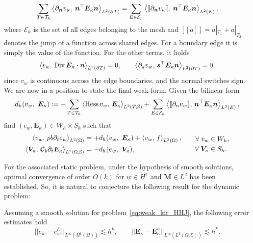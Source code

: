 \begin{equation*}
\sum_{T \in \mathcal{T}_h} \inner[L^2(\partial T)]{\partial_{\bm{n}} v_w}{\bm{n}^\top\bm{E}_\kappa \bm{n}} = \sum_{E \in \mathcal{E}_h} \inner[L^2(E)]{[\![\partial_{\bm{n}} v_w]\!]}{\bm{n}^\top\bm{E}_\kappa \bm{n}},
\end{equation*} 
where $\mathcal{E}_h$ is the set of all edges belonging to the mesh and $[\![a]\!] = a|_{T_1} + a|_{T_2}$ denotes the jump of a function across shared edges. For a boundary edge it is simply the value of the function. For the other terms, it holds 
\[
\inner[L^2(\partial T)]{v_w}{\Div \bm{E}_\kappa \cdot \bm{n}} = 0, \qquad \inner[L^2(\partial T)]{\partial_{\bm{s}} v_w}{\bm{s}^\top\bm{E}_\kappa \bm{n}} = 0,
\]
since $v_w$ is continuous across the edge boundaries, and the normal switches sign. We are now in a position to state the final weak form. Given the bilinear form
\begin{equation}\label{eq:bil_HHJ}
d_h(v_w, \ \bm{E}_{\kappa}) := - \sum_{T \in \mathcal{T}_h} \inner[L^2(T, \mathbb{S})]{\Hess v_w}{\bm{E}_\kappa} + \sum_{E \in \mathcal{E}_h} \inner[L^2(E)]{[\![\partial_n v_w]\!]}{\bm{n}^\top\bm{E}_\kappa \bm{n}}, 
\end{equation}
find $(e_w, \bm{E}_\kappa) \in W_h \times S_h$ such that
\begin{equation}
\label{eq:weak_kir_HHJ}
\begin{aligned}
\inner[L^2(\Omega)]{v_w}{\rho b \partial_t {e}_w} &= +d_h(v_w, \ \bm{E}_{\kappa}) + \inner[L^2(\Omega)]{v_w}{f}, \\ 
\inner[L^2(\Omega, \mathbb{S})]{\bm{V}_\kappa}{\bm{\mathcal{C}}_b \partial_t {\bm{E}}_\kappa} &= -d_h(e_w, \ \bm{V}_{\kappa}), \\ 
\end{aligned} \qquad
\begin{aligned}
\forall \; v_w &\in W_h, \\
\forall \; \bm{V}_\kappa &\in S_h. \\
\end{aligned}
\end{equation}

For the associated static problem, under the hypothesis of smooth solutions, optimal convergence of order $O(k)$ for $w \in H^1$ and $\bm{M} \in L^2$ has been established. So, it is natural to conjecture the following result for the dynamic problem:
\begin{conjecture}
	\label{conj:HHJestimates}
	Assuming a smooth solution for problem~\eqref{eq:weak_kir_HHJ}, the following error estimates hold
	\begin{equation}
	\label{eq:errHHJ}
	||e_w - e_w^h||_{L^{\infty} (H^1(\Omega))} \lesssim h^{k}, \qquad
	||\bm{E}_\kappa - \bm{E}_\kappa^h||_{L^{\infty} (L^2(\Omega, \mathbb{S}))} \lesssim h^{k}.
	\end{equation}
\end{conjecture}



